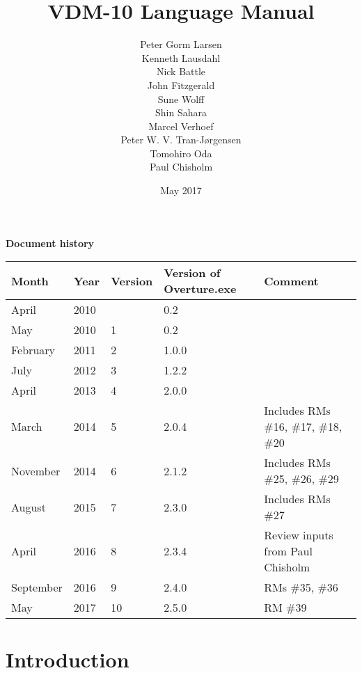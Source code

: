 \documentclass{overturerepchap}
\begin{document}
\title{VDM-10 Language Manual}
\author{Peter Gorm Larsen\\
        Kenneth Lausdahl\\
        Nick Battle\\
        John Fitzgerald\\
        Sune Wolff\\
        Shin Sahara\\
        Marcel Verhoef\\
        Peter W. V. Tran-J\o{}rgensen\\
        Tomohiro Oda\\
        Paul Chisholm}

\date{May 2017}

\maketitle


{\textbf{Document history}}

\begin{tabular}{|l|l|l|l|l|}\hline
Month   & Year & Version & Version of Overture.exe & Comment \\ \hline
April   & 2010 &         & 0.2   & \\ \hline
May     & 2010 & 1       & 0.2   &  \\ \hline
February& 2011 & 2       & 1.0.0 &  \\ \hline
July    & 2012 & 3       & 1.2.2 & \\ \hline
April   & 2013 & 4       & 2.0.0 & \\ \hline
March & 2014 & 5 & 2.0.4 &
Includes RMs \#16, \#17, \#18, \#20 \\ \hline
November & 2014 & 6 & 2.1.2 &
Includes RMs \#25, \#26, \#29 \\ \hline
August & 2015 & 7 & 2.3.0 &
Includes RMs \#27 \\ \hline
April & 2016 & 8 & 2.3.4 & Review inputs from Paul Chisholm \\ \hline
September & 2016 & 9 & 2.4.0 & RMs \#35, \#36 \\ \hline
May & 2017 & 10 & 2.5.0 & RM \#39\\ \hline
\end{tabular}

\tableofcontents
\newpage
\mbox{}
\newpage
{}
\setcounter{page}{1}

\chapter{Introduction}
\end{document}
